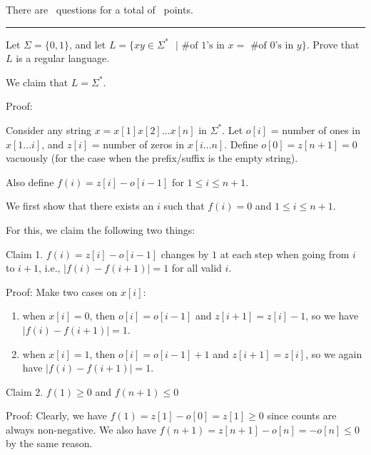 \documentclass[answers]{exam}
\begin{document}
\vspace{0.1in}

\vspace{0.1in}
There are \numquestions\, questions for a total of \numpoints\, points.
\vspace{0.1in}
\hrule
\vspace{0.2in}
\begin{questions}

    \question[4] 
    Let $\Sigma=\{0,1\}$, and let $L=\{xy\in\Sigma^*\text{ }|\text{ \# of 1's in }x=\text{ \# of 0's in }y\}$. Prove that $L$ is a regular language.

    \begin{solution}
        We claim that $L = \Sigma^*$.

        Proof:

        Consider any string $x = x[1] x[2] \ldots x[n]$ in $\Sigma^*$. Let $o[i]$ = number of ones in $x[1 \ldots i]$, and $z[i]$ = number of zeros in $x[i \ldots n]$. Define $o[0] = z[n + 1] = 0$ vacuously (for the case when the prefix/suffix is the empty string).

        Also define $f(i) = z[i] - o[i - 1]$ for $1 \le i \le n + 1$.

        We first show that there exists an $i$ such that $f(i) = 0$ and $1 \le i \le n + 1$.

        For this, we claim the following two things:

        Claim 1. $f(i) = z[i] - o[i - 1]$ changes by $1$ at each step when going from $i$ to $i + 1$, i.e., $|f(i) - f(i + 1)| = 1$ for all valid $i$.
        
        Proof: Make two cases on $x[i]$:
        \begin{enumerate}
            \item when $x[i] = 0$, then $o[i] = o[i - 1]$ and $z[i + 1] = z[i] - 1$, so we have $|f(i) - f(i + 1)| = 1$.
            \item when $x[i] = 1$, then $o[i] = o[i - 1] + 1$ and $z[i + 1] = z[i]$, so we again have $|f(i) - f(i + 1)| = 1$.
        \end{enumerate}

        Claim 2. $f(1) \ge 0$ and $f(n + 1) \le 0$

        Proof: Clearly, we have $f(1) = z[1] - o[0] = z[1] \ge 0$ since counts are always non-negative. We also have $f(n + 1) = z[n + 1] - o[n] = -o[n] \le 0$ by the same reason.


\end{solution}
\end{questions}
\end{document}
